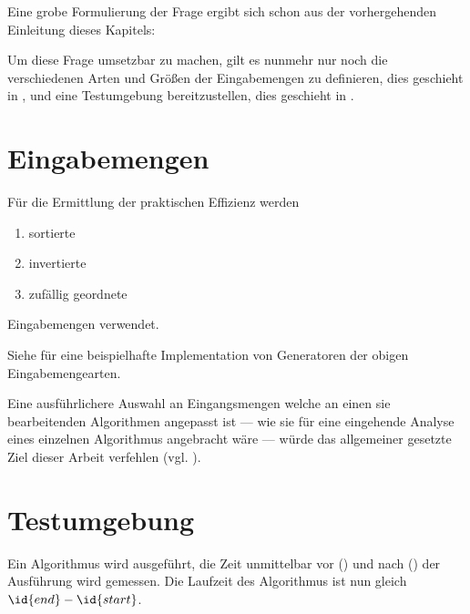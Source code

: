 Eine grobe Formulierung der Frage ergibt sich schon aus der vorhergehenden Einleitung dieses Kapitels:


Um diese Frage umsetzbar zu machen, gilt es nunmehr nur noch die verschiedenen Arten und Größen der Eingabemengen zu definieren, dies geschieht in , und eine Testumgebung bereitzustellen, dies geschieht in .

\section{Eingabemengen}
\label{sec:runtime-inputs}


Für die Ermittlung der praktischen Effizienz werden
\begin{enumerate}[nosep]
    \item sortierte
    \item invertierte
    \item zufällig geordnete
\end{enumerate}
Eingabemengen verwendet.

Siehe  für eine beispielhafte Implementation von Generatoren der obigen Eingabemengearten.

Eine ausführlichere Auswahl an Eingangsmengen welche an einen sie bearbeitenden Algorithmen angepasst ist --- wie sie für eine eingehende Analyse eines einzelnen Algorithmus angebracht wäre --- würde das allgemeiner gesetzte Ziel dieser Arbeit verfehlen (vgl. \cite[27ff]{mcg2012}).

\section{Testumgebung}
\label{sec:runtime-environment}

Ein Algorithmus wird ausgeführt, die Zeit unmittelbar vor () und nach () der Ausführung wird gemessen. Die Laufzeit des Algorithmus ist nun gleich $\id{end} - \id{start}$.

